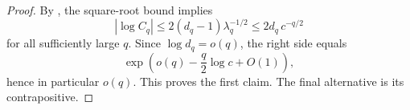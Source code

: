 \begin{proof}
  By , the
  square-root bound
  implies
  \[
    |\log C_q|
    \le 2(d_q-1)\lambda_q^{-1/2}
    \le 2d_q\,c^{-q/2}
  \]
  for all sufficiently large \(q\). Since \(\log d_q=o(q)\), the right
  side equals
  \[
    \exp\!\left(o(q)-\frac{q}{2}\log c+O(1)\right),
  \]
  hence in particular \(o(q)\). This proves the first claim. The final
  alternative is its contrapositive.
\end{proof}

